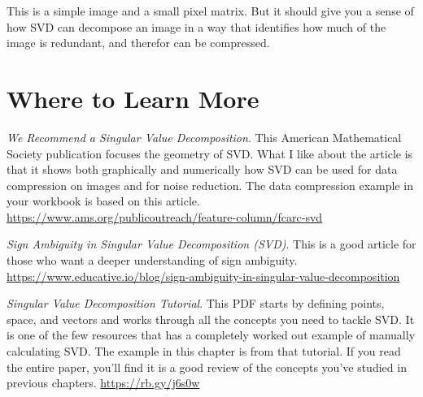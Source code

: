This is a simple image and a small pixel matrix. But it should give you a sense of how SVD can decompose an image in a way that identifies how much of the image is redundant, and therefor can be compressed.

\section{Where to Learn More}
\emph {We Recommend a Singular Value Decomposition}. This American Mathematical Society publication focuses the geometry of SVD. What I like about the article is that it  shows both graphically and numerically how SVD can be used for data compression on images and for noise reduction. The data compression example in your workbook is based on this article. \url{https://www.ams.org/publicoutreach/feature-column/fcarc-svd}

\emph {Sign Ambiguity in Singular Value Decomposition (SVD)}. This is a good article for those who want a deeper understanding of sign ambiguity. \url{https://www.educative.io/blog/sign-ambiguity-in-singular-value-decomposition}

\emph {Singular Value Decomposition Tutorial}. This PDF starts by defining points, space, and vectors and works through all the concepts you need to tackle SVD. It is one of the few resources that has a completely worked out example of manually calculating SVD. The example in this chapter is from that tutorial. If you read the entire paper, you'll find it is a good review of the concepts you've studied in previous chapters. \url{https://rb.gy/j6s0w}
